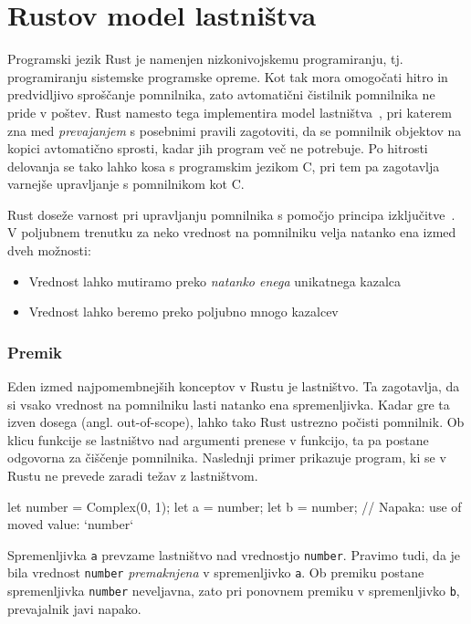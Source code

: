 \section{Rustov model lastništva}

Programski jezik Rust je namenjen nizkonivojskemu programiranju, tj. programiranju sistemske programske opreme. Kot tak mora omogočati hitro in predvidljivo sproščanje pomnilnika, zato avtomatični čistilnik pomnilnika ne pride v poštev. Rust namesto tega implementira model lastništva~\cite{klabnik2023rust}, pri katerem zna med \textit{prevajanjem} s posebnimi pravili zagotoviti, da se pomnilnik objektov na kopici avtomatično sprosti, kadar jih program več ne potrebuje. Po hitrosti delovanja se tako lahko kosa s programskim jezikom C, pri tem pa zagotavlja varnejše upravljanje s pomnilnikom kot C.

Rust doseže varnost pri upravljanju pomnilnika s pomočjo principa izključitve~\cite{Jung}. V poljubnem trenutku za neko vrednost na pomnilniku velja natanko ena izmed dveh možnosti:

\begin{itemize}
	\itemsep 0em
	\item Vrednost lahko mutiramo preko \textit{natanko enega} unikatnega kazalca
	\item Vrednost lahko beremo preko poljubno mnogo kazalcev
\end{itemize}

\subsubsection{Premik}

Eden izmed najpomembnejših konceptov v Rustu je lastništvo. Ta zagotavlja, da si vsako vrednost na pomnilniku lasti natanko ena spremenljivka. Kadar gre ta izven dosega (angl. out-of-scope), lahko tako Rust ustrezno počisti pomnilnik. Ob klicu funkcije se lastništvo nad argumenti prenese v funkcijo, ta pa postane odgovorna za čiščenje pomnilnika. Naslednji primer prikazuje program, ki se v Rustu ne prevede zaradi težav z lastništvom.

\begin{rust-failure}
	let number = Complex(0, 1);
	let a = number;
	let b = number;  // Napaka: use of moved value: `number`
\end{rust-failure}

Spremenljivka \texttt{a} prevzame lastništvo nad vrednostjo \texttt{number}. Pravimo tudi, da je bila vrednost \texttt{number} \textit{premaknjena} v spremenljivko \texttt{a}. Ob premiku postane spremenljivka \texttt{number} neveljavna, zato pri ponovnem premiku v spremenljivko \texttt{b}, prevajalnik javi napako.

